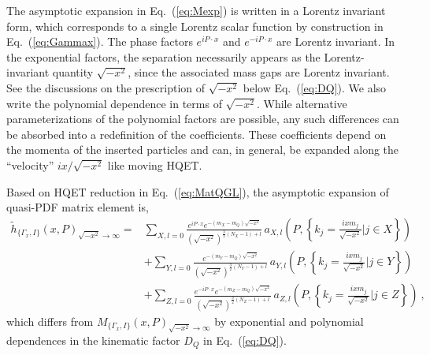 \documentclass[a4paper,11pt]{article}
\begin{document}
The asymptotic expansion in Eq.~(\ref{eq:Mexp}) is written in a Lorentz invariant form, which corresponds to a single Lorentz scalar function by construction in Eq.~(\ref{eq:Gammax}). The phase factors $e^{i P \cdot x}$ and $e^{-i P \cdot x}$ are Lorentz invariant. In the exponential factors, the separation necessarily appears as the Lorentz-invariant quantity $\sqrt{-x^2}$, since the associated mass gaps are Lorentz invariant. See the discussions on the prescription of $\sqrt{-x^2}$ below Eq.~(\ref{eq:DQ}). We also write the polynomial dependence in terms of $\sqrt{-x^2}$. While alternative parameterizations of the polynomial factors are possible, any such differences can be absorbed into a redefinition of the coefficients. These coefficients depend on the momenta of the inserted particles and can, in general, be expanded along the “velocity” $i x /\sqrt{-x^2}$ like moving HQET. 

Based on HQET reduction in Eq.~(\ref{eq:MatQGL}), the asymptotic expansion of quasi-PDF matrix element is,
\begin{align}\label{eq:hexp}
\tilde{h}_{\{\Gamma_x,I\}}(x,P)_{\sqrt{-x^2} \rightarrow \infty} 
= & \sum_{X,l=0} \frac{e^{i P \cdot x}e^{-(m_X-m_Q)\sqrt{-x^2}}}{\left(\sqrt{-x^2}\right)^{\frac{3}{2}(N_X-1)+l}} \, a_{X,l}\left(P, \left\{k_j = \frac{i x m_j}{\sqrt{-x^2}} \bigg| j\in X\right\}\right) \nonumber\\
&+ \sum_{Y,l=0} \frac{e^{-(m_Y-m_Q)\sqrt{-x^2}}}{\left(\sqrt{-x^2}\right)^{\frac{3}{2}(N_Y-1)+l}} \, a_{Y,l}\left(P, \left\{k_j = \frac{i x m_j}{\sqrt{-x^2}} \bigg| j\in Y\right\}\right) \nonumber\\
&+ \sum_{Z,l=0} \frac{e^{-i P \cdot x}e^{-(m_Z-m_Q)\sqrt{-x^2}}}{\left(\sqrt{-x^2}\right)^{\frac{3}{2}(N_Z-1)+l}} \, a_{Z,l}\left(P, \left\{k_j = \frac{i x m_j}{\sqrt{-x^2}} \bigg| j\in Z\right\}\right) \ ,
\end{align}
which differs from $M_{\{\Gamma_x,I\}}(x,P)_{\sqrt{-x^2} \rightarrow \infty}$ by exponential and polynomial dependences in the kinematic factor $D_{Q}$ in Eq.~(\ref{eq:DQ}).
\end{document}
